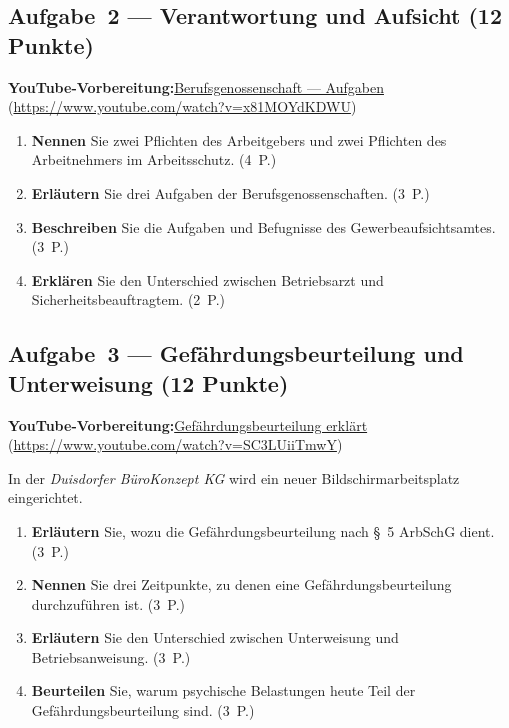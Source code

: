 \documentclass[11pt, a4paper]{article}
\begin{document}
\subsection*{Aufgabe~2 --- Verantwortung und Aufsicht (12 Punkte)}

\noindent\textbf{\color{bfwAccent}YouTube-Vorbereitung:}\enspace \href{https://www.youtube.com/watch?v=x81MOYdKDWU}{Berufsgenossenschaft --- Aufgaben} (\url{https://www.youtube.com/watch?v=x81MOYdKDWU})

\medskip
\begin{enumerate}[label=(\alph*)]
  \item \textbf{Nennen} Sie zwei Pflichten des Arbeitgebers und zwei Pflichten des Arbeitnehmers im Arbeitsschutz. \hfill (4~P.)
  \item \textbf{Erläutern} Sie drei Aufgaben der Berufsgenossenschaften. \hfill (3~P.)
  \item \textbf{Beschreiben} Sie die Aufgaben und Befugnisse des Gewerbeaufsichtsamtes. \hfill (3~P.)
  \item \textbf{Erklären} Sie den Unterschied zwischen Betriebsarzt und Sicherheitsbeauftragtem. \hfill (2~P.)
\end{enumerate}

\subsection*{Aufgabe~3 --- Gefährdungsbeurteilung und Unterweisung (12 Punkte)}

\noindent\textbf{\color{bfwAccent}YouTube-Vorbereitung:}\enspace \href{https://www.youtube.com/watch?v=SC3LUiiTmwY}{Gefährdungsbeurteilung erklärt} (\url{https://www.youtube.com/watch?v=SC3LUiiTmwY})

\medskip
In der \emph{Duisdorfer BüroKonzept KG} wird ein neuer Bildschirmarbeitsplatz eingerichtet.

\begin{enumerate}[label=(\alph*)]
  \item \textbf{Erläutern} Sie, wozu die Gefährdungsbeurteilung nach \S~5 ArbSchG dient. \hfill (3~P.)
  \item \textbf{Nennen} Sie drei Zeitpunkte, zu denen eine Gefährdungsbeurteilung durchzuführen ist. \hfill (3~P.)
  \item \textbf{Erläutern} Sie den Unterschied zwischen Unterweisung und Betriebsanweisung. \hfill (3~P.)
  \item \textbf{Beurteilen} Sie, warum psychische Belastungen heute Teil der Gefährdungsbeurteilung sind. \hfill (3~P.)
\end{enumerate}
\end{document}
